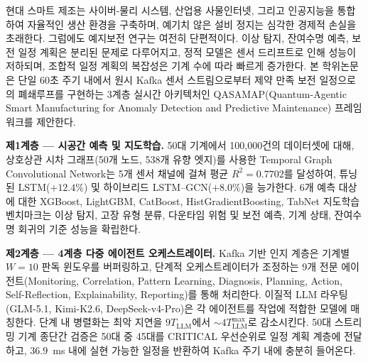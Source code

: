 현대 스마트 제조는 사이버-물리 시스템, 산업용 사물인터넷, 그리고 인공지능을 통합하여 자율적인 생산 환경을 구축하며, 예기치 않은 설비 정지는 심각한 경제적 손실을 초래한다. 그럼에도 예지보전 연구는 여전히 단편적이다. 이상 탐지, 잔여수명 예측, 보전 일정 계획은 분리된 문제로 다루어지고, 정적 모델은 센서 드리프트로 인해 성능이 저하되며, 조합적 일정 계획의 복잡성은 기계 수에 따라 빠르게 증가한다. 본 학위논문은 단일 60초 주기 내에서 원시 Kafka 센서 스트림으로부터 제약 만족 보전 일정으로의 폐쇄루프를 구현하는 3계층 실시간 아키텍처인 QASAMAP(Quantum-Agentic Smart Manufacturing for Anomaly Detection and Predictive Maintenance) 프레임워크를 제안한다.

\textbf{제1계층 --- 시공간 예측 및 지도학습.} 50대 기계에서 100{,}000건의 데이터셋에 대해, 상호상관 시차 그래프(50개 노드, 538개 유향 엣지)를 사용한 Temporal Graph Convolutional Network는 5개 센서 채널에 걸쳐 평균 $R^2 = 0.7702$를 달성하여, 튜닝된 LSTM($+12.4\%$) 및 하이브리드 LSTM--GCN($+8.0\%$)을 능가한다. 6개 예측 대상에 대한 XGBoost, LightGBM, CatBoost, HistGradientBoosting, TabNet 지도학습 벤치마크는 이상 탐지, 고장 유형 분류, 다운타임 위험 및 보전 예측, 기계 상태, 잔여수명 회귀의 기준 성능을 확립한다.

\textbf{제2계층 --- 4계층 다중 에이전트 오케스트레이터.} Kafka 기반 인지 계층은 기계별 $W=10$ 판독 윈도우를 버퍼링하고, 단계적 오케스트레이터가 조정하는 9개 전문 에이전트(Monitoring, Correlation, Pattern Learning, Diagnosis, Planning, Action, Self-Reflection, Explainability, Reporting)를 통해 처리한다. 이질적 LLM 라우팅(GLM-5.1, Kimi-K2.6, DeepSeek-v4-Pro)은 각 에이전트를 작업에 적합한 모델에 매칭한다. 단계 내 병렬화는 최악 지연을 $9 T_{\text{LLM}}$에서 $\sim 4 T_{\text{LLM}}^{\max}$로 감소시킨다. 50대 스트리밍 기계 종단간 검증은 50대 중 45대를 CRITICAL 우선순위로 일정 계획 계층에 전달하고, $36.9$~ms 내에 실현 가능한 일정을 반환하여 Kafka 주기 내에 충분히 들어온다.

